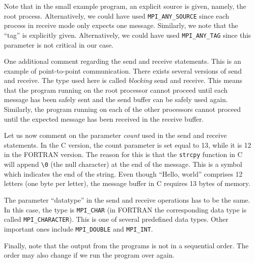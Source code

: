 Note that in the small example program, an explicit source is given, namely, the
root process. Alternatively, we could have used \texttt{MPI\_ANY\_SOURCE} since
each process in receive mode only expects one message. Similarly, we note that
the ``tag'' is explicitly given. Alternatively, we could have used
\texttt{MPI\_ANY\_TAG} since this parameter is not critical in our case.

One additional comment regarding the send and receive statements. This is an
example of point-to-point communication. There exists several versions of send
and receive. The type used here is called \emph{blocking} send and receive. This
means that the program running on the root processor cannot proceed until each
message has been safely sent and the send buffer can be safely used again.
Similarly, the program running on each of the other processors cannot proceed
until the expected message has been received in the receive buffer.

Let us now comment on the parameter \emph{count} used in the send and receive
statements. In the C version, the count parameter is set equal to 13, while it
is 12 in the FORTRAN version. The reason for this is that the \texttt{strcpy}
function in C will append \texttt{\textbackslash 0} (the null character) at the
end of the message. This is a symbol which indicates the end of the string. Even
though ``Hello, world'' comprises 12 letters (one byte per letter), the message
buffer in C requires 13 bytes of memory.

The parameter ``datatype'' in the send and receive operations has to be the same.
In this case, the type is \texttt{MPI\_CHAR} (in FORTRAN the corresponding data
type is called \texttt{MPI\_CHARACTER}). This is one of several predefined data
types. Other important ones include \texttt{MPI\_DOUBLE} and \texttt{MPI\_INT}.

Finally, note that the output from the programs is not in a sequential order.
The order may also change if we run the program over again.
